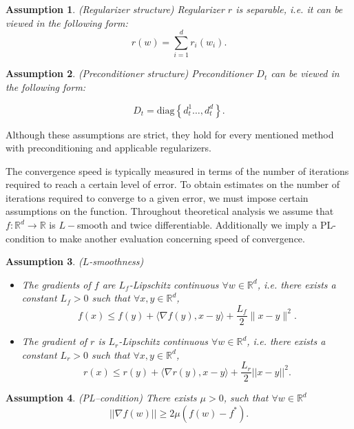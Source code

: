 \documentclass[USenglish]{article}
\theoremstyle{dgthm}
\newtheorem{assumption}{Assumption}
\theoremstyle{dgdef}
\begin{document}
\begin{assumption}{(Regularizer structure)}
    \label{ass:regstruct}
    Regularizer $r$ is separable, i.e. it can be viewed in the following form:
    $$r(w) = \sum_{i=1}^d r_i(w_i).$$
\end{assumption}

\begin{assumption}{(Preconditioner structure)}
    \label{ass:precondstruct}
    Preconditioner $D_t$ can be viewed in the following form:
\end{assumption}
$$ D_t = \textrm{diag} \left\{ d_t^1 \ldots, d
_t^d \right\}.$$

Although these assumptions are strict, they hold for every mentioned method with preconditioning and applicable regularizers.

The convergence speed is typically measured in terms of the number of iterations required to reach a certain level of error.
To obtain estimates on the number of iterations required to converge to a given error, we must impose certain assumptions on the function.
Throughout theoretical analysis we assume that $f : \mathbb{R}^d \rightarrow \mathbb{R}$ is $L-$smooth and twice differentiable.
Additionally we imply a PL-condition to make another evaluation concerning speed of convergence.

\begin{assumption}{($L$-smoothness)} 
\label{ass:smoothness}
\begin{itemize}
    \item 	The gradients of $f$ are $L_f$-Lipschitz continuous $\forall w \in \mathbb{R}^d$, i.e. there exists a constant $L_f > 0$ such that $\forall x, y \in \mathbb{R}^d$,
    	\begin{equation*}
    		f(x) \leq f(y) + \langle \nabla f(y), x-y \rangle + \frac{L_f}{2} \|x - y\|^2.
    	\end{equation*}
    \item    The gradient of $r$ is $L_r$-Lipschitz continuous $\forall w \in \mathbb{R}^d$, i.e. there exists a constant $L_r > 0$ such that $\forall x, y \in \mathbb{R}^d$,
	\begin{equation*}
		r(x) \leq r(y) + \langle \nabla r(y), x-y \rangle + \frac{L_r}{2} ||x - y||^2.
	\end{equation*}
\end{itemize}
\end{assumption}

\begin{assumption}{(PL--condition)}
\label{ass:plcondition}
	There exists $\mu > 0$, such that $\forall w \in \mathbb{R}^d$
    $$||\nabla f(w) || \geq 2 \mu (f(w) - f^*).$$
\end{assumption}
\end{document}
